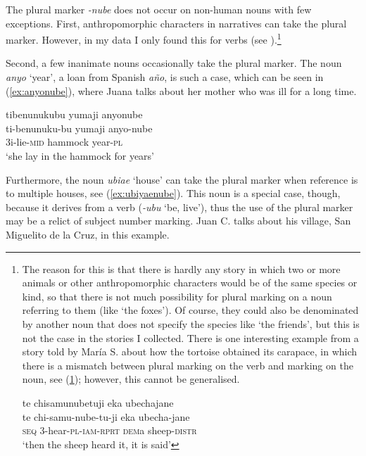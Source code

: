 The plural marker \textit{-nube} does not occur on non-human nouns with few exceptions. First, anthropomorphic characters in narratives can take the plural marker. However, in my data I only found this for verbs (see ).\footnote{The reason for this is that there is hardly any story in which two or more animals or other anthropomorphic characters would be of the same species or kind, so that there is not much possibility for plural marking on a noun referring to them (like ‘the foxes’). Of course, they could also be denominated by another noun that does not specify the species like ‘the friends’, but this is not the case in the stories I collected. There is one interesting example from a story told by María S. about how the tortoise obtained its carapace, in which there is a mismatch between plural marking on the verb and  marking on the noun, see (\ref{ex:mismatch}); however, this cannot be generalised.

\ea\label{ex:mismatch}
\begingl
\glpreamble te chisamunubetuji eka ubechajane\\
\gla te chi-samu-nube-tu-ji eka ubecha-jane\\
\glb \textsc{seq} 3-hear-\textsc{pl}-\textsc{iam}-\textsc{rprt} \textsc{dem}a sheep-\textsc{distr}\\
\glft ‘then the sheep heard it, it is said’
\endgl
\trailingcitation{[rxx-n121128s.10]}
\xe}

Second, a few inanimate nouns occasionally take the plural marker. The noun \textit{anyo} ‘year’, a loan from Spanish \textit{año}, is such a case, which can be seen in (\ref{ex:anyonube}), where Juana talks about her mother who was ill for a long time.

\ea\label{ex:anyonube}
\begingl 
\glpreamble tibenunukubu yumaji anyonube\\
\gla ti-benunuku-bu yumaji anyo-nube\\ 
\glb 3i-lie-\textsc{mid} hammock year-\textsc{pl}\\ 
\glft ‘she lay in the hammock for years’\\ 
\endgl
\trailingcitation{[jxx-p120430l-2.501]}
\xe

Furthermore, the noun \textit{ubiae} ‘house’ can take the plural marker when reference is to multiple houses, see (\ref{ex:ubiyaenube}). This noun is a special case, though, because it derives from a verb (\textit{-ubu} ‘be, live’), thus the use of the plural marker may be a relict of subject number marking. Juan C. talks about his village, San Miguelito de la Cruz, in this example.

